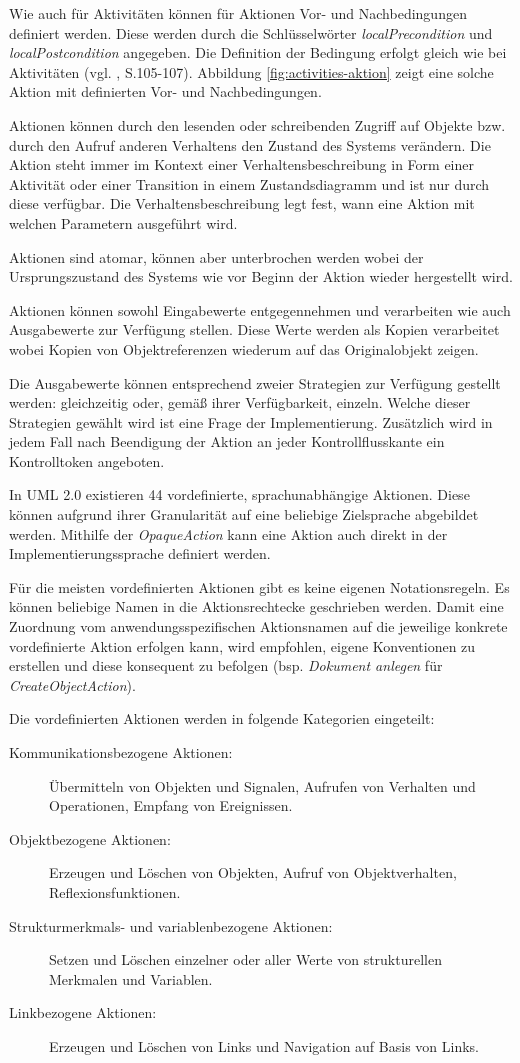 Wie auch für Aktivitäten können für Aktionen Vor- und Nachbedingungen definiert werden. Diese werden durch die Schlüsselwörter \emph{localPrecondition} und \emph{localPostcondition} angegeben. Die Definition der Bedingung erfolgt gleich wie bei Aktivitäten (vgl. \citep{PilonePitman2005}, S.105-107). Abbildung \ref{fig:activities-aktion} zeigt eine solche Aktion mit definierten Vor- und Nachbedingungen.

Aktionen können durch den lesenden oder schreibenden Zugriff auf Objekte bzw. durch den Aufruf anderen Verhaltens den Zustand des Systems verändern. Die Aktion steht immer im Kontext einer Verhaltensbeschreibung in Form einer Aktivität oder einer Transition in einem Zustandsdiagramm und ist nur durch diese verfügbar. Die Verhaltensbeschreibung legt fest, wann eine Aktion mit welchen Parametern ausgeführt wird.

Aktionen sind atomar, können aber unterbrochen werden wobei der Ursprungszustand des Systems wie vor Beginn der Aktion wieder hergestellt wird.

Aktionen können sowohl Eingabewerte entgegennehmen und verarbeiten wie auch Ausgabewerte zur Verfügung stellen. Diese Werte werden als Kopien verarbeitet wobei Kopien von Objektreferenzen wiederum auf das Originalobjekt zeigen.

Die Ausgabewerte können entsprechend zweier Strategien zur Verfügung gestellt werden: gleichzeitig oder, gemäß ihrer Verfügbarkeit, einzeln. Welche dieser Strategien gewählt wird ist eine Frage der Implementierung. Zusätzlich wird in jedem Fall nach Beendigung der Aktion an jeder Kontrollflusskante ein Kontrolltoken angeboten.

In UML 2.0 existieren 44 vordefinierte, sprachunabhängige Aktionen. Diese können aufgrund ihrer Granularität auf eine beliebige Zielsprache abgebildet werden. Mithilfe der \emph{OpaqueAction} kann eine Aktion auch direkt in der Implementierungssprache definiert werden.

Für die meisten vordefinierten Aktionen gibt es keine eigenen Notationsregeln. Es können beliebige Namen in die Aktionsrechtecke geschrieben werden. Damit eine Zuordnung vom anwendungsspezifischen Aktionsnamen auf die jeweilige konkrete vordefinierte Aktion erfolgen kann, wird empfohlen, eigene Konventionen zu erstellen und diese konsequent zu befolgen (bsp. \emph{Dokument anlegen} für \emph{CreateObjectAction}).

Die vordefinierten Aktionen werden in folgende Kategorien eingeteilt:
\begin{description}
\item[Kommunikationsbezogene Aktionen:] Übermitteln von Objekten und Signalen, Aufrufen von Verhalten und Operationen, Empfang von Ereignissen.
\item[Objektbezogene Aktionen:] Erzeugen und Löschen von Objekten, Aufruf von Objektverhalten, Reflexionsfunktionen.
\item[Strukturmerkmals- und variablenbezogene Aktionen:] Setzen und Löschen einzelner oder aller Werte von strukturellen Merkmalen und Variablen.
\item[Linkbezogene Aktionen:] Erzeugen und Löschen von Links und Navigation auf Basis von Links.
\end{description}

